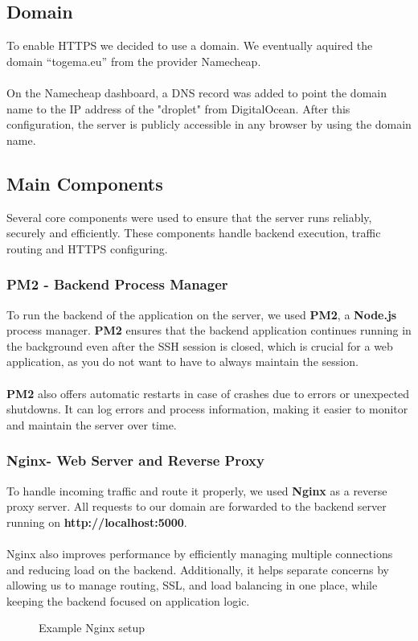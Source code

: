 \documentclass[a4paper,12pt]{report}
\begin{document}
\subsection{Domain}
To enable HTTPS we decided to use a domain. We eventually aquired the domain “togema.eu” from the provider Namecheap.\\\\
On the Namecheap dashboard, a DNS record was added to point the domain name to the IP address of the "droplet" from DigitalOcean. After this configuration, the server is publicly accessible in any browser by using the domain name.
\subsection{Main Components}
Several core components were used to ensure that the server runs reliably, securely and efficiently. These components handle backend execution, traffic routing and HTTPS configuring.
\subsubsection{PM2 - Backend Process Manager}
To run the backend of the application on the server, we used \textbf{PM2}, a \textbf{Node.js} process manager. \textbf{PM2} ensures that the backend application continues running in the background even after the SSH session is closed, which is crucial for a web application, as you do not want to have to always maintain the session.\\\\
\textbf{PM2} also offers automatic restarts in case of crashes due to errors or unexpected shutdowns. It can log errors and process information, making it easier to monitor and maintain the server over time.
\subsubsection{Nginx- Web Server and Reverse Proxy}
To handle incoming traffic and route it properly, we used \textbf{Nginx} as a reverse proxy server. All requests to our domain are forwarded to the backend server running on \textbf{http://localhost:5000}.\\\\
Nginx also improves performance by efficiently managing multiple connections and reducing load on the backend. Additionally, it helps separate concerns by allowing us to manage routing, SSL, and load balancing in one place, while keeping the backend focused on application logic.
\begin{figure}[H]
	\caption{Example Nginx setup}
	\label{fig:nginx-config}
\end{figure}
\end{document}
